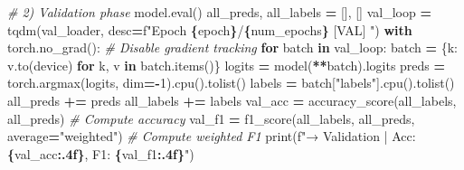 \documentclass[
]{article}
\newenvironment{Shaded}{\begin{snugshade}}{\end{snugshade}}
\newcommand{\BuiltInTok}[1]{#1}
\newcommand{\CommentTok}[1]{\textcolor[rgb]{0.56,0.35,0.01}{\textit{#1}}}
\newcommand{\ControlFlowTok}[1]{\textcolor[rgb]{0.13,0.29,0.53}{\textbf{#1}}}
\newcommand{\DecValTok}[1]{\textcolor[rgb]{0.00,0.00,0.81}{#1}}
\newcommand{\KeywordTok}[1]{\textcolor[rgb]{0.13,0.29,0.53}{\textbf{#1}}}
\newcommand{\NormalTok}[1]{#1}
\newcommand{\OperatorTok}[1]{\textcolor[rgb]{0.81,0.36,0.00}{\textbf{#1}}}
\newcommand{\SpecialCharTok}[1]{\textcolor[rgb]{0.81,0.36,0.00}{\textbf{#1}}}
\newcommand{\SpecialStringTok}[1]{\textcolor[rgb]{0.31,0.60,0.02}{#1}}
\newcommand{\StringTok}[1]{\textcolor[rgb]{0.31,0.60,0.02}{#1}}
\begin{document}
\begin{Shaded}
\begin{Highlighting}[]
    \CommentTok{\# 2) Validation phase}
\NormalTok{    model.}\BuiltInTok{eval}\NormalTok{()}
\NormalTok{    all\_preds, all\_labels }\OperatorTok{=}\NormalTok{ [], []}
\NormalTok{    val\_loop }\OperatorTok{=}\NormalTok{ tqdm(val\_loader, desc}\OperatorTok{=}\SpecialStringTok{f"Epoch }\SpecialCharTok{\{}\NormalTok{epoch}\SpecialCharTok{\}}\SpecialStringTok{/}\SpecialCharTok{\{}\NormalTok{num\_epochs}\SpecialCharTok{\}}\SpecialStringTok{ [VAL]  "}\NormalTok{)}
    \ControlFlowTok{with}\NormalTok{ torch.no\_grad():  }\CommentTok{\# Disable gradient tracking}
        \ControlFlowTok{for}\NormalTok{ batch }\KeywordTok{in}\NormalTok{ val\_loop:}
\NormalTok{            batch }\OperatorTok{=}\NormalTok{ \{k: v.to(device) }\ControlFlowTok{for}\NormalTok{ k, v }\KeywordTok{in}\NormalTok{ batch.items()\}}
\NormalTok{            logits }\OperatorTok{=}\NormalTok{ model(}\OperatorTok{**}\NormalTok{batch).logits}
\NormalTok{            preds  }\OperatorTok{=}\NormalTok{ torch.argmax(logits, dim}\OperatorTok{={-}}\DecValTok{1}\NormalTok{).cpu().tolist()}
\NormalTok{            labels }\OperatorTok{=}\NormalTok{ batch[}\StringTok{"labels"}\NormalTok{].cpu().tolist()}
\NormalTok{            all\_preds }\OperatorTok{+=}\NormalTok{ preds}
\NormalTok{            all\_labels }\OperatorTok{+=}\NormalTok{ labels}
\NormalTok{    val\_acc }\OperatorTok{=}\NormalTok{ accuracy\_score(all\_labels, all\_preds)  }\CommentTok{\# Compute accuracy}
\NormalTok{    val\_f1  }\OperatorTok{=}\NormalTok{ f1\_score(all\_labels, all\_preds, average}\OperatorTok{=}\StringTok{"weighted"}\NormalTok{)  }\CommentTok{\# Compute weighted F1}
    \BuiltInTok{print}\NormalTok{(}\SpecialStringTok{f"→ Validation | Acc: }\SpecialCharTok{\{}\NormalTok{val\_acc}\SpecialCharTok{:.4f\}}\SpecialStringTok{, F1: }\SpecialCharTok{\{}\NormalTok{val\_f1}\SpecialCharTok{:.4f\}}\SpecialStringTok{"}\NormalTok{)}


\end{Highlighting}
\end{Shaded}
\end{document}
